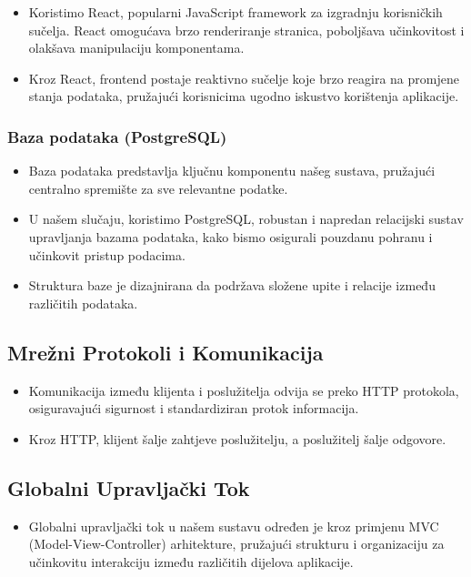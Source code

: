 \begin{itemize}
    \item Koristimo React, popularni JavaScript framework za izgradnju korisničkih sučelja. React omogućava brzo renderiranje stranica, poboljšava učinkovitost i olakšava manipulaciju komponentama.
    \item Kroz React, frontend postaje reaktivno sučelje koje brzo reagira na promjene stanja podataka, pružajući korisnicima ugodno iskustvo korištenja aplikacije.
\end{itemize}

 

\subsubsection*{Baza podataka (PostgreSQL)}
\begin{itemize}
    \item Baza podataka predstavlja ključnu komponentu našeg sustava, pružajući centralno spremište za sve relevantne podatke. 
    \item U našem slučaju, koristimo PostgreSQL, robustan i napredan relacijski sustav upravljanja bazama podataka, kako bismo osigurali pouzdanu pohranu i učinkovit pristup podacima. 
    \item Struktura baze je dizajnirana da podržava složene upite i relacije između različitih podataka.
\end{itemize}

\subsection*{Mrežni Protokoli i Komunikacija}
\begin{itemize}
    \item Komunikacija između klijenta i poslužitelja odvija se preko HTTP protokola, osiguravajući sigurnost i standardiziran protok informacija.
    \item Kroz HTTP, klijent šalje zahtjeve poslužitelju, a poslužitelj šalje odgovore. 
\end{itemize}

\subsection*{Globalni Upravljački Tok}
\begin{itemize}
    \item Globalni upravljački tok u našem sustavu određen je kroz primjenu MVC (Model-View-Controller) arhitekture, pružajući strukturu i organizaciju za učinkovitu interakciju između različitih dijelova aplikacije. 
\end{itemize}

